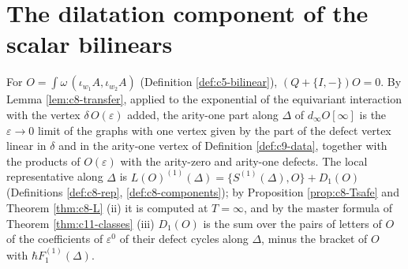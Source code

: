 \section{The dilatation component of the scalar bilinears}

For $O=\int\omega\,(\iota_{w_1}A,\iota_{w_2}A)$ (Definition \ref{def:c5-bilinear}), $(Q+\{I,-\})O=0$. By Lemma \ref{lem:c8-transfer}, applied to the exponential of the equivariant interaction with the vertex $\delta\,O(\varepsilon)$ added, the arity-one part along $\Delta$ of $d_\infty O[\infty]$ is the $\varepsilon\to0$ limit of the graphs with one vertex given by the part of the defect vertex linear in $\delta$ and in the arity-one vertex of Definition \ref{def:c9-data}, together with the products of $O(\varepsilon)$ with the arity-zero and arity-one defects. The local representative along $\Delta$ is $L(O)^{(1)}(\Delta)=\{S^{(1)}(\Delta),O\}+D_1(O)$ (Definitions \ref{def:c8-rep}, \ref{def:c8-components}); by Proposition \ref{prop:c8-Tsafe} and Theorem \ref{thm:c8-L} (ii) it is computed at $T=\infty$, and by the master formula of Theorem \ref{thm:c11-classes} (iii) $D_1(O)$ is the sum over the pairs of letters of $O$ of the coefficients of $\varepsilon^0$ of their defect cycles along $\Delta$, minus the bracket of $O$ with $\hbar F_1^{(1)}(\Delta)$.

